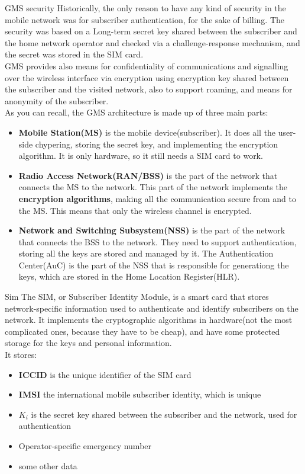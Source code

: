 \begin{section}{GMS security}
  Historically, the only reason to have any kind of security in the mobile network was for
  subscriber authentication, for the sake of billing. The security was based on a Long-term secret
  key shared between the subscriber and the home network operator and checked via a
  challenge-response mechanism, and the secret was stored in the SIM card.\\
  GMS provides also means for confidentiality of communications and signalling over the wireless
  interface via encryption using encryption key shared between the subscriber and the visited
  network, also to support roaming, and means for anonymity of the subscriber.\\

  As you can recall, the GMS architecture is made up of three main parts: 
  \begin{itemize}
    \item \textbf{Mobile Station(MS)} is the mobile device(subscriber). It does all the user-side
      chypering, storing the secret key, and implementing the encryption algorithm. It is only
      hardware, so it still needs a SIM card to work.
    \item \textbf{Radio Access Network(RAN/BSS)} is the part of the network that connects the MS to
      the network. This part of the network implements the \textbf{encryption algorithms}, making
      all the communication secure from and to the MS. This means that only the wireless channel is
      encrypted.
    \item \textbf{Network and Switching Subsystem(NSS)} is the part of the network that connects the
      BSS to the network. They need to support authentication, storing all the keys are stored and
      managed by it. The Authentication Center(AuC) is the part of the NSS that is responsible for
      generationg the keys, which are stored in the Home Location Register(HLR).
  \end{itemize}

  \begin{subsection}{Sim}
    The SIM, or Subscriber Identity Module, is a smart card that stores network-specific information
    used to authenticate and identify subscribers on the network. It implements the cryptographic
    algorithms in hardware(not the most complicated ones, because they have to be cheap), and have
    some protected storage for the keys and personal information.\\
    It stores:
    \begin{itemize}
      \item \textbf{ICCID} is the unique identifier of the SIM card
      \item \textbf{IMSI} the international mobile subscriber identity, which is unique
      \item \textbf{$K_i$} is the secret key shared between the subscriber and the network, used for
        authentication
      \item Operator-specific emergency number
      \item some other data
    \end{itemize}


\end{subsection}
\end{section}
